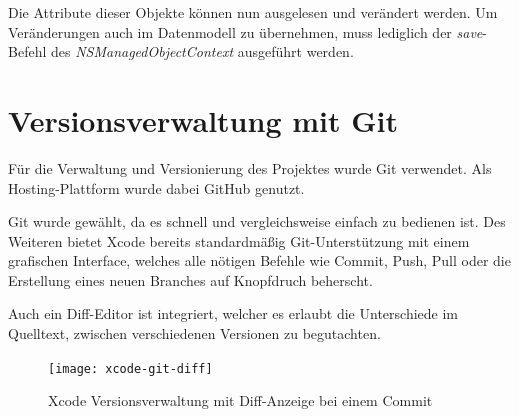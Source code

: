 Die Attribute dieser Objekte können nun ausgelesen und verändert werden. Um Veränderungen auch im Datenmodell zu übernehmen, muss lediglich der \emph{save}-Befehl des \emph{NSManagedObjectContext} ausgeführt werden.

\section{Versionsverwaltung mit Git}
\label{sec:tools:git}
Für die Verwaltung und Versionierung des Projektes wurde Git verwendet. Als Hosting-Plattform wurde dabei GitHub genutzt.

Git wurde gewählt, da es schnell und vergleichsweise einfach zu bedienen ist. Des Weiteren bietet Xcode bereits standardmäßig Git-Unterstützung mit einem grafischen Interface, welches alle nötigen Befehle wie Commit, Push, Pull oder die Erstellung eines neuen Branches auf Knopfdruch beherscht.

Auch ein Diff-Editor ist integriert, welcher es erlaubt die Unterschiede im Quelltext, zwischen verschiedenen Versionen zu begutachten.

\begin{figure}[htb!]
		  \centering
	\texttt{[image: xcode-git-diff]}
	\caption{Xcode Versionsverwaltung mit Diff-Anzeige bei einem Commit}
	\label{xcode-git-diff}
\end{figure}



